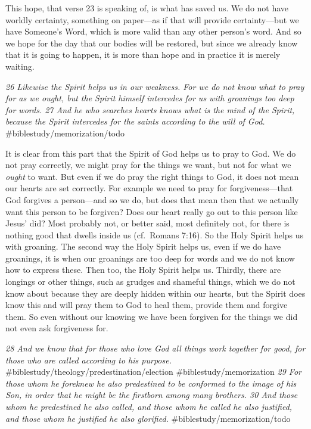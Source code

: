 This hope, that verse 23 is speaking of, is what has saved us. We do not
have worldly certainty, something on paper---as if that will provide
certainty---but we have Someone's Word, which is more valid than any
other person's word. And so we hope for the day that our bodies will be
restored, but since we already know that it is going to happen, it is
more than hope and in practice it is merely waiting.

\emph{26 Likewise the Spirit helps us in our weakness. For we do not
know what to pray for as we ought, but the Spirit himself intercedes for
us with groanings too deep for words. 27 And he who searches hearts
knows what is the mind of the Spirit, because the Spirit intercedes for
the saints according to the will of God.}
\#biblestudy/memorization/todo

It is clear from this part that the Spirit of God helps us to pray to
God. We do not pray correctly, we might pray for the things we want, but
not for what we \emph{ought} to want. But even if we do pray the right
things to God, it does not mean our hearts are set correctly. For
example we need to pray for forgiveness---that God forgives a
person---and so we do, but does that mean then that we actually want
this person to be forgiven? Does our heart really go out to this person
like Jesus' did? Most probably not, or better said, most definitely not,
for there is nothing good that dwells inside us (cf.~Romans 7:16). So
the Holy Spirit helps us with groaning. The second way the Holy Spirit
helps us, even if we do have groanings, it is when our groanings are too
deep for words and we do not know how to express these. Then too, the
Holy Spirit helps us. Thirdly, there are longings or other things, such
as grudges and shameful things, which we do not know about because they
are deeply hidden within our hearts, but the Spirit does know this and
will pray them to God to heal them, provide them and forgive them. So
even without our knowing we have been forgiven for the things we did not
even ask forgiveness for.

\emph{28 And we know that for those who love God all things work
together for good, for those who are called according to his purpose.}
\#biblestudy/theology/predestination/election \#biblestudy/memorization
\emph{29 For those whom he foreknew he also predestined to be
conformed to the image of his Son, in order that he might be the
firstborn among many brothers. 30 And those whom he predestined he also
called, and those whom he called he also justified, and those whom he
justified he also glorified.} \#biblestudy/memorization/todo

